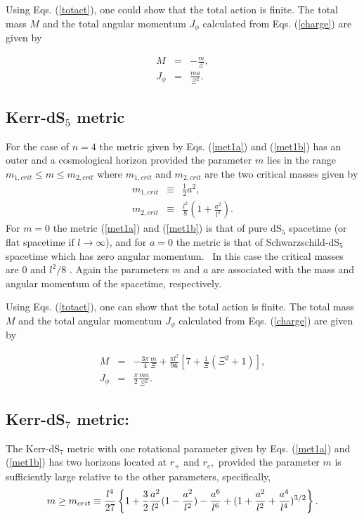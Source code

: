 \documentclass[a4paper,12pt,onecolumn]{revtex4}
\begin{document}
Using Eqs. (\ref{totact}), one could show that the total action is finite.
The total mass $M$ and the total angular momentum $J_\phi $ calculated from
Eqs. (\ref{charge}) are given by

\begin{eqnarray*}
M &=&-\frac m\Xi , \\
J_\phi  &=&\frac{ma}{\Xi ^2}.
\end{eqnarray*}

\subsection{Kerr-dS$_5$ metric}

For the case of $n=4$ the metric given by Eqs. (\ref{met1a}) and
(\ref{met1b}) has an outer and a cosmological horizon provided the
parameter $m$ lies in the range $ m_{1,crit}\leq m\leq m_{2,crit}$
where $m_{1,crit}$ and $m_{2,crit}$ are the two critical masses
given by
\begin{eqnarray}
m_{1,crit} &\equiv &\frac 12a^2,  \nonumber \\
m_{2,crit} &\equiv &\frac{l^2}8\left(1+\frac{a^2}{l^2}\right).
\label{mcrit5}
\end{eqnarray}
For $m=0$ the metric (\ref{met1a}) and (\ref{met1b}) is that of
pure dS$_5$ spacetime (or flat spacetime if $l\rightarrow \infty
$), and for $a=0$ the metric is that of Schwarzschild-dS$_5$
spacetime which has zero angular momentum. \ In this case the
critical masses are $0$ and $l^2/8$ \cite{Kl1}. Again the
parameters $m$ and $a$ are associated with the mass and angular
momentum of the spacetime, respectively.

Using Eqs. (\ref{totact}), one can show that the total action is
finite. The total mass $M$ and the total angular momentum $J_\phi
$ calculated from Eqs. (\ref{charge}) are given by

\begin{eqnarray*}
M &=&-\frac{3\pi }4\frac m\Xi +\frac{\pi l^2}{96}\left[7+\frac
1\Xi (\Xi^2+1)\right],\\
J_\phi  &=&\frac \pi 2\frac{ma}{\Xi ^2}.
\end{eqnarray*}

\subsection{Kerr-dS$_7$ metric:}

The Kerr-dS$_7$ metric with one rotational parameter given by Eqs.
(\ref{met1a}) and (\ref{met1b}) has two horizons located at
$r_{+}$ and $r_c$,\ provided the parameter $m$ is sufficiently
large relative to the other parameters, specifically,
\begin{equation}
m\geq m_{crit}\equiv \frac{l^4}{27}\left\{1+\frac 32\frac{a^2}{l^2}(1-\frac{a^2}{%
l^2})-\frac{a^6}{l^6}+(1+\frac{a^2}{l^2}+\frac{a^4}{l^4})^{3/2}\right\}.
\label{mcrit5}
\end{equation}
\end{document}
